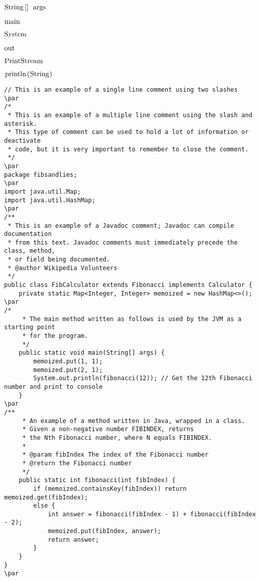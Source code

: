 \documentclass{book}
\def\lthtmlcheckvsize{\ifdim\ht\sizebox<\vsize 
  \ifdim\wd\sizebox<\hsize\expandafter\hfill\fi \expandafter\vfill
  \else\expandafter\vss\fi}%
\begin{document}
{\newpage\clearpage
{}%
$\lstinline{String[] args}$%
\lthtmlindisplaymathZ
\lthtmlcheckvsize\clearpage}

{\newpage\clearpage
{}%
$\lstinline{main}$%
\lthtmlindisplaymathZ
\lthtmlcheckvsize\clearpage}

{\newpage\clearpage
{}%
$\lstinline{System}$%
\lthtmlindisplaymathZ
\lthtmlcheckvsize\clearpage}

{\newpage\clearpage
{}%
$\lstinline{out}$%
\lthtmlindisplaymathZ
\lthtmlcheckvsize\clearpage}

{\newpage\clearpage
{}%
$\lstinline{PrintStream}$%
\lthtmlindisplaymathZ
\lthtmlcheckvsize\clearpage}

{\newpage\clearpage
{}%
$\lstinline{println(String)}$%
\lthtmlindisplaymathZ
\lthtmlcheckvsize\clearpage}

{\newpage\clearpage
{}%
\begin{lstlisting}
// This is an example of a single line comment using two slashes
\par
/*
 * This is an example of a multiple line comment using the slash and asterisk.
 * This type of comment can be used to hold a lot of information or deactivate
 * code, but it is very important to remember to close the comment.
 */
\par
package fibsandlies;
\par
import java.util.Map;
import java.util.HashMap;
\par
/**
 * This is an example of a Javadoc comment; Javadoc can compile documentation
 * from this text. Javadoc comments must immediately precede the class, method,
 * or field being documented.
 * @author Wikipedia Volunteers
 */
public class FibCalculator extends Fibonacci implements Calculator {
    private static Map<Integer, Integer> memoized = new HashMap<>();
\par
/*
     * The main method written as follows is used by the JVM as a starting point
     * for the program.
     */
    public static void main(String[] args) {
        memoized.put(1, 1);
        memoized.put(2, 1);
        System.out.println(fibonacci(12)); // Get the 12th Fibonacci number and print to console
    }
\par
/**
     * An example of a method written in Java, wrapped in a class.
     * Given a non-negative number FIBINDEX, returns
     * the Nth Fibonacci number, where N equals FIBINDEX.
     * 
     * @param fibIndex The index of the Fibonacci number
     * @return the Fibonacci number
     */
    public static int fibonacci(int fibIndex) {
        if (memoized.containsKey(fibIndex)) return memoized.get(fibIndex);
        else {
            int answer = fibonacci(fibIndex - 1) + fibonacci(fibIndex - 2);
            memoized.put(fibIndex, answer);
            return answer;
        }
    }
}
\par
\end{lstlisting}%
\lthtmlfigureZ
\lthtmlcheckvsize\clearpage}
\end{document}
